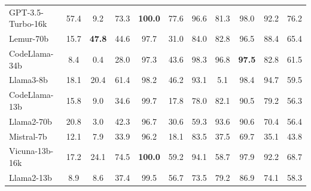 \begin{table}[t!]
{\begin{tabular}{lcccccccccc}
GPT-3.5-Turbo-16k & 57.4 & 9.2 & 73.3 & \textbf{100.0} & 77.6 & 96.6 & 81.3 & 98.0 & 92.2 &  76.2  \\



Lemur-70b & 15.7 & \textbf{47.8} & 44.6 & 97.7 & 31.0 & 84.0 & 82.8 & 96.5 & 88.4 &  65.4 \\ 

CodeLlama-34b & 8.4 & 0.4 & 28.0 & 97.3 & 43.6 & 98.3 & 96.8 & \textbf{97.5} & 82.8 &  61.5 \\

Llama3-8b & 18.1 & 20.4 & 61.4 & 98.2 & 46.2 & 93.1 & 5.1 &98.4 & 94.7 & 59.5\\


CodeLlama-13b & 15.8 & 9.0 & 34.6 & 99.7 & 17.8 & 78.0 & 82.1 & 90.5 & 79.2 &  56.3 \\


Llama2-70b & 20.8 & 3.0 & 42.3 & 96.7 & 30.6 & 59.3 & 93.6 & 90.6 & 70.4 &  56.4 \\



Mistral-7b & 12.1 & 7.9 & 33.9 & 96.2 & 18.1 & 83.5 & 37.5 & 69.7 & 35.1 &  43.8 \\

Vicuna-13b-16k & 17.2 & 24.1 & 74.5 & \textbf{100.0} & 59.2 & 94.1 & 58.7 & 97.9 & 92.2 &  68.7 \\


Llama2-13b  & 8.9 & 8.6 & 37.4 & 99.5 & 56.7 & 73.5 & 79.2 & 86.9 & 74.1 &  58.3  \\




\bottomrule

\end{tabular}}

\vspace{-2mm}
\label{tab: grounding}

\end{table}






